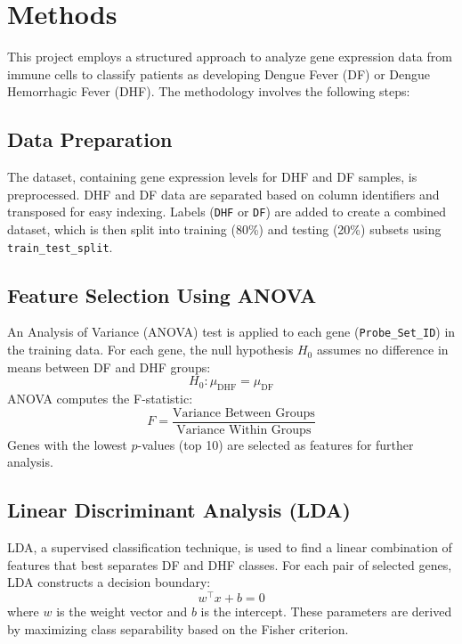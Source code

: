 \documentclass[final]{article}
\begin{document}
\section*{Methods}
This project employs a structured approach to analyze gene expression data from immune cells to classify patients as developing Dengue Fever (DF) or Dengue Hemorrhagic Fever (DHF). The methodology involves the following steps:

\subsection*{Data Preparation}
The dataset, containing gene expression levels for DHF and DF samples, is preprocessed. DHF and DF data are separated based on column identifiers and transposed for easy indexing. Labels (\texttt{DHF} or \texttt{DF}) are added to create a combined dataset, which is then split into training (80\%) and testing (20\%) subsets using \texttt{train\_test\_split}.

\subsection*{Feature Selection Using ANOVA}
An Analysis of Variance (ANOVA) test is applied to each gene (\texttt{Probe\_Set\_ID}) in the training data. For each gene, the null hypothesis $H_0$ assumes no difference in means between DF and DHF groups:
\begin{equation}
    H_0: \mu_{\text{DHF}} = \mu_{\text{DF}}
\end{equation}
ANOVA computes the F-statistic:
\begin{equation}
    F = \frac{\text{Variance Between Groups}}{\text{Variance Within Groups}}
\end{equation}
Genes with the lowest $p$-values (top 10) are selected as features for further analysis.

\subsection*{Linear Discriminant Analysis (LDA)}
LDA, a supervised classification technique, is used to find a linear combination of features that best separates DF and DHF classes. For each pair of selected genes, LDA constructs a decision boundary:
\begin{equation}
    w^\top x + b = 0
\end{equation}
where $w$ is the weight vector and $b$ is the intercept. These parameters are derived by maximizing class separability based on the Fisher criterion.
\end{document}
